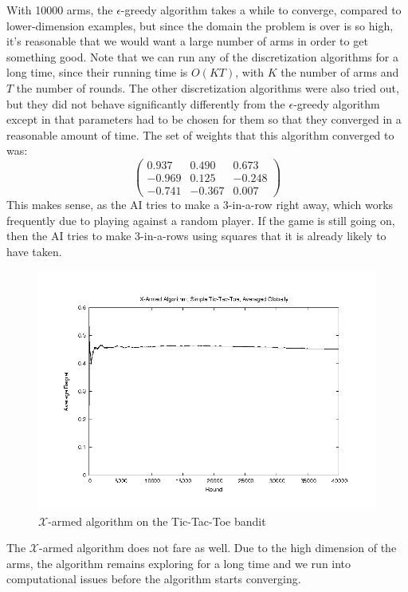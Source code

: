 With 10000 arms, the $\epsilon$-greedy algorithm takes a while to 
converge, compared to lower-dimension examples, but since the
domain the problem is over is so high, it's reasonable that we would want
a large number of arms in order to get something good.  Note that we can
run any of the discretization algorithms for a long time, since their
running time is $O(KT)$, with $K$ the number of arms and $T$ the number
of rounds.  The other discretization algorithms were also tried out,
but they did not behave significantly differently from the
$\epsilon$-greedy algorithm except in that parameters had to be chosen for
them so that they converged in a reasonable amount of time.  The set of
weights that this algorithm converged to was:
\[
\left(
\begin{array}{ccc}
0.937 & 0.490 & 0.673 \\
-0.969 & 0.125 & -0.248 \\
-0.741 & -0.367 & 0.007
\end{array}
\right)
\]
This makes sense, as the AI tries to make a 3-in-a-row right away, which
works frequently due to playing against a random player.  If the game is
still going on, then the AI tries to make 3-in-a-rows using squares that
it is already likely to have taken.

\begin{figure}[!ht]
  \begin{center}
    \includegraphics[width=\figwidth]{data/tictactoe/xarmtoe_GA.png}
     \caption{$\mathcal{X}$-armed algorithm on the Tic-Tac-Toe bandit}
     \label{fig:xarmtoe}
  \end{center}
\end{figure}
The $\mathcal{X}$-armed algorithm does not fare as well.  Due to the high
dimension of the arms, the algorithm remains exploring for a long time
and we run into computational issues before the algorithm starts
converging.

